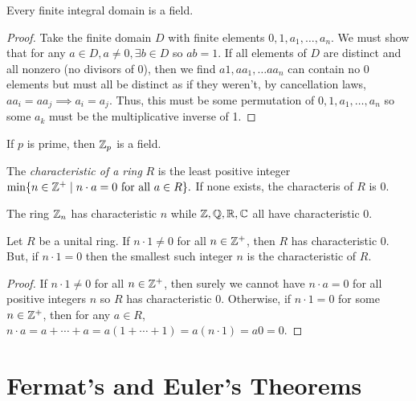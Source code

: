\begin{theorem}
    Every finite integral domain is a field.
\end{theorem}
\begin{proof}
    Take the finite domain $D$ with finite elements $0, 1, a_1, \ldots, a_n$. We must show that for any $a \in D, a \neq 0, \exists b \in D$ so $ab =1$. If all elements of $D$ are distinct and all nonzero (no divisors of 0), then we find $a1, aa_1, \ldots aa_n$ can contain no 0 elements but must all be distinct as if they weren't, by cancellation laws, $aa_i = aa_j \implies a_i = a_j$. Thus, this must be some permutation of $0, 1, a_1, \ldots, a_n$ so some $a_k$ must be the multiplicative inverse of 1.
\end{proof}
\begin{corollary}
    If $p$ is prime, then $\mathbb{Z}_p$ is a field.
\end{corollary}
\begin{definition}
    The \emph{characteristic of a ring} $R$ is the least positive integer $\min\{n \in \mathbb{Z}^+ \mid n\cdot a = 0 \text{ for all } a \in R\}.$ If none exists, the characteris of $R$ is 0.
\end{definition}
\begin{example}
    The ring $\mathbb{Z}_n$ has characteristic $n$ while $\mathbb{Z}, \mathbb{Q}, \mathbb{R}, \mathbb{C}$ all have characteristic 0.
\end{example}
\begin{theorem}
    Let $R$ be a unital ring. If $n \cdot 1 \neq 0$ for all $n \in \mathbb{Z}^+$, then $R$ has characteristic 0. But, if $n \cdot 1 = 0$ then the smallest such integer $n$ is the characteristic of $R$.
\end{theorem}
\begin{proof}
    If $n \cdot 1 \neq 0$ for all $n \in \mathbb{Z}^+$, then surely we cannot have $n \cdot a = 0$ for all positive integers $n$ so $R$ has characteristic 0. Otherwise, if $n \cdot 1 = 0$ for some $n \in \mathbb{Z}^+$, then for any $a \in R$, $n \cdot a = a + \cdots + a = a(1 + \cdots + 1) = a(n \cdot 1) = a0 = 0.$
\end{proof}

\section{Fermat's and Euler's Theorems}

